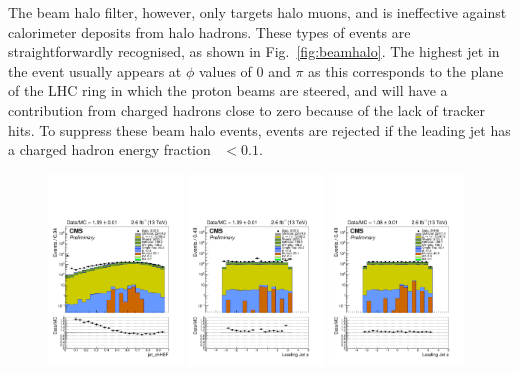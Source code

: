 The beam halo filter, however, only targets halo muons, and is ineffective 
against calorimeter deposits from halo hadrons. These types of events are 
straightforwardly recognised, as shown in Fig.~\ref{fig:beamhalo}. The highest 
\pt jet in the event usually appears at $\phi$ values of 0 and $\pi$ as this 
corresponds to the plane of the LHC ring in which the proton beams are steered, 
and will have a contribution from charged hadrons close to zero because of the 
lack of tracker hits. To suppress these beam halo events, events are rejected 
if the leading jet has a charged hadron energy fraction \chf~$<0.1$.

\begin{figure}
\begin{center}
\includegraphics[width=0.32\textwidth]{figs/analysis/jet_chHEF_mono_all_before.pdf}
\includegraphics[width=0.32\textwidth]{figs/analysis/jet_phi[0]_mono_all_before.pdf}
\includegraphics[width=0.32\textwidth]{figs/analysis/jet_phi[0]_mono_all_after.pdf}

\end{center}
\end{figure}
